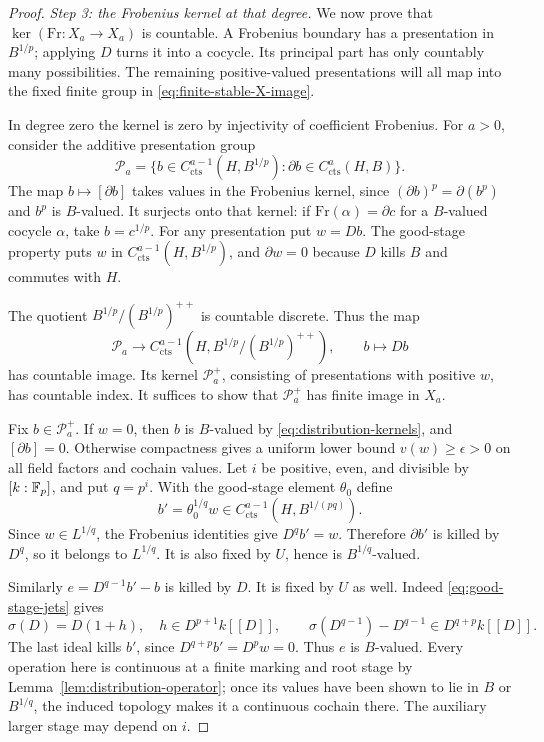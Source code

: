 \begin{proof}
\smallskip\noindent\emph{Step 3: the Frobenius kernel at that degree.}
We now prove that $\ker(\mathrm{Fr}:X_a\to X_a)$ is countable.
A Frobenius boundary has a presentation in $B^{1/p}$; applying $D$
turns it into a cocycle.  Its principal part has only countably many
possibilities.  The remaining positive-valued presentations will
all map into the fixed finite group in
\eqref{eq:finite-stable-X-image}.

In degree zero the kernel is zero by injectivity of coefficient
Frobenius.  For $a>0$, consider the additive presentation group
\[
 \mathcal P_a=
 \{b\in C^{a-1}_{\mathrm{cts}}(H,B^{1/p}):
                  \partial b\in C^a_{\mathrm{cts}}(H,B)\}.
\]
The map $b\mapsto[\partial b]$ takes values in the Frobenius kernel,
since $(\partial b)^p=\partial(b^p)$ and $b^p$ is $B$-valued.
It surjects onto that kernel:
if $\mathrm{Fr}(\alpha)=\partial c$ for a $B$-valued cocycle
$\alpha$, take $b=c^{1/p}$.  For any presentation put $w=Db$.
The good-stage property puts $w$ in
$C^{a-1}_{\mathrm{cts}}(H,B^{1/p})$, and $\partial w=0$
because $D$ kills $B$ and commutes with $H$.

The quotient $B^{1/p}/(B^{1/p})^{++}$ is countable discrete.
Thus the map
\[
 \mathcal P_a\longrightarrow
 C^{a-1}_{\mathrm{cts}}
       (H,B^{1/p}/(B^{1/p})^{++}),\qquad b\longmapsto Db
\]
has countable image.  Its kernel $\mathcal P_a^+$, consisting
of presentations with positive $w$, has countable index.
It suffices to show that $\mathcal P_a^+$ has finite image in
$X_a$.

Fix $b\in\mathcal P_a^+$.  If $w=0$, then $b$ is $B$-valued
by \eqref{eq:distribution-kernels}, and $[\partial b]=0$.
Otherwise compactness gives a uniform lower bound
$v(w)\ge\epsilon>0$ on all field factors and cochain values.
Let $i$ be positive, even, and divisible by $[k:\mathbb F_p]$, and put
$q=p^i$.  With the good-stage element $\theta_0$ define
\begin{equation}
 \label{eq:Frobenius-presentation-lift}
 b'=\theta_0^{1/q}w
 \in C^{a-1}_{\mathrm{cts}}(H,B^{1/(pq)}).
\end{equation}
Since $w\in L^{1/q}$, the Frobenius identities give
$D^qb'=w$.  Therefore $\partial b'$ is killed by $D^q$,
so it belongs to $L^{1/q}$.  It is also fixed by $U$, hence
is $B^{1/q}$-valued.

Similarly $e=D^{q-1}b'-b$ is killed by $D$.  It is fixed by
$U$ as well.  Indeed \eqref{eq:good-stage-jets} gives
\[
 \sigma(D)=D(1+h),\quad h\in D^{p+1}k[[D]],
 \qquad
 \sigma(D^{q-1})-D^{q-1}\in D^{q+p}k[[D]].
\]
The last ideal kills $b'$, since $D^{q+p}b'=D^pw=0$.
Thus $e$ is $B$-valued.  Every operation here is continuous
at a finite marking and root stage by
Lemma~\ref{lem:distribution-operator}; once its values have
been shown to lie in $B$ or $B^{1/q}$, the induced topology
makes it a continuous cochain there.  The auxiliary larger
stage may depend on $i$.


\end{proof}
